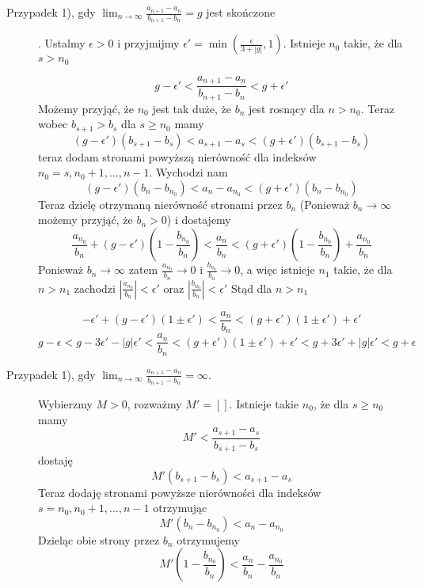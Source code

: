 \documentclass[9pt]{article}
\begin{document}
\begin{description}

    \item[Przypadek 1), gdy $\lim_{n \to \infty} {\frac{a_{n+1}-a_n}{b_{n+1}-b_n}} = g$ jest
        skończone]. Ustalmy $\epsilon > 0$ i przyjmijmy $\epsilon' = \min(\frac{\epsilon}{3+|g|},
        1)$. Istnieje $n_0$ takie, że dla $s > n_0$

        \[
            g-\epsilon' < \frac{a_{n+1}-a_n}{b_{n+1}-b_n} < g+\epsilon'
        \]
        Możemy przyjąć, że $n_0$ jest tak duże, że $b_n$ jest rosnący dla $n > n_0$. Teraz wobec
        $b_{s+1} > b_s$ dla $s \ge n_0$ mamy
        \[
            (g - \epsilon') (b_{s+1} - b_s) < a_{s+1}-a_s < (g + \epsilon')(b_{s+1} - b_s)
        \]
        teraz dodam stronami powyższą nierówność dla indeksów $n_0 = s, n_0+1, ..., n-1$. Wychodzi
        nam
        \[
            (g - \epsilon') (b_n - b_{n_0}) < a_n - a_{n_0} < (g+\epsilon')(b_n - b_{n_0})
        \]
        Teraz dzielę otrzymaną nierówność stronami przez $b_n$ (Ponieważ $b_n \to \infty$ możemy
        przyjąć, że $b_n > 0$) i dostajemy
        \[
            \frac{a_{n_0}}{b_n} + (g - \epsilon') (1 - \frac{b_{n_0}}{b_n}) < \frac{a_n}{b_n} < (g+\epsilon')(1 -
            \frac{b_{n_0}}{b_n}) + \frac{a_{n_0}}{b_n}
        \]
        Ponieważ $b_n \to \infty$ zatem $\frac{a_{n_0}}{b_n} \to 0$ i $\frac{b_{n_0}}{b_n} \to 0$, a więc
        istnieje $n_1$ takie, że dla $n > n_1$ zachodzi $\left|\frac{a_{n_0}}{b_n}\right| < \epsilon'$
        oraz $\left|\frac{b_{n_0}}{b_n}\right| < \epsilon'$ Stąd dla $n > n_1$

        \[
            -\epsilon' + (g-\epsilon')(1 \pm \epsilon') < \frac{a_n}{b_n} < (g+\epsilon')(1\pm
            \epsilon') + \epsilon'
        \]
        \[
            g - \epsilon < g - 3\epsilon' - |g|\epsilon' < \frac{a_n}{b_n} < (g+\epsilon')(1\pm
            \epsilon') + \epsilon' < g + 3\epsilon' + |g|\epsilon' < g+\epsilon
        \]
    \item[Przypadek 1), gdy $\lim_{n \to \infty} {\frac{a_{n+1}-a_n}{b_{n+1}-b_n}} = \infty$.]
        Wybierzmy $M > 0$, rozważmy $M' = []$. Istnieje takie $n_0$, że dla $s \ge n_0$ mamy
        \[
            M' < \frac{a_{s+1} - a_s}{b_{s+1}-b_s}
        \]
        dostaję
        \[
            M'(b_{s+1}-b_s) < a_{s+1} - a_s
        \]
        Teraz dodaję stronami powyższe nierówności dla indeksów $s = n_0, n_0+1, ..., n-1$
        otrzymując
        \[
            M'(b_n - b_{n_0}) < a_n - a_{n_0}
        \]
        Dzieląc obie strony przez $b_n$ otrzymujemy
        \[
            M'(1 - \frac{b_{n_0}}{b_n}) < \frac{a_n}{b_n} - \frac{a_{n_0}}{b_n}
        \]


\end{description}
\end{document}
